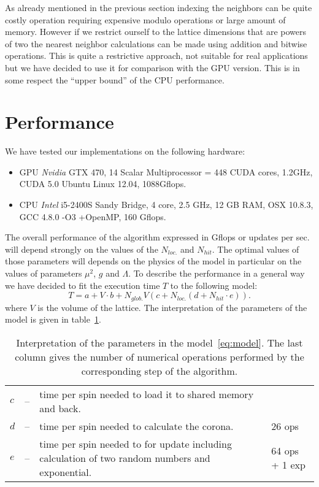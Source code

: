 \documentclass[a4paper]{llncs}
\begin{document}
As already mentioned in the previous section indexing the neighbors
can be quite costly operation requiring expensive modulo
operations or large amount of memory. However if
we restrict ourself to the lattice dimensions that are powers of two
the nearest neighbor calculations can be made using addition and bitwise
operations. This is quite a restrictive approach, not suitable
for real applications but we have decided to use it for comparison
with the GPU version. This is in some respect the ``upper bound'' of
the CPU performance.


\section{Performance}
\label{sec:performance}

We have tested our implementations on  the following hardware:
\begin{itemize}
\item GPU \emph{Nvidia} GTX 470, 14 Scalar Multiprocessor = 448 CUDA cores, 1.2GHz, CUDA 5.0 Ubuntu Linux 12.04, 1088Gflops.
\item CPU \emph{Intel} i5-2400S Sandy Bridge, 4 core, 2.5 GHz, 12 GB RAM, OSX 10.8.3, GCC 4.8.0 -O3 +OpenMP, 160 Gflops. 
\end{itemize}

The overall performance of the algorithm expressed in Gflops or
updates per sec. will depend strongly on the values of the $N_{loc.}$
and $N_{hit}$. The optimal values of those parameters will depends on
the physics of the model in particular on the values of parameters
$\mu^2$, $g$ and $\Lambda$. To describe the performance in a general
way we have decided to fit the execution time $T$ to the following
model:
\begin{equation}\label{eq:model}
T  = a+ V \cdot b +
N_{glob.} V \left(c + N_{loc.}\left(d + N_{hit}\cdot e\right)\right) . 
\end{equation}
where $V$ is the volume of the lattice.  The interpretation of the
parameters of the model is given in table~\ref{tab:pars-int}.

\begin{table}
\begin{center} \begin{tabular}{lcp{8cm}p{2cm}}
$c$ &--& time per spin needed to load it to shared memory and back.&\\
$d$ &--& time per spin needed to calculate the corona.& 26 ops\\
$e$ &--& time per spin needed to for update including calculation of two
random numbers and exponential. & 64 ops + 1 exp
\end{tabular}
\end{center}
\caption{\label{tab:pars-int}Interpretation of the parameters in the
model~\ref{eq:model}. The last column gives the number of numerical operations
performed by the corresponding step of the algorithm.}
\end{table}
\end{document}
